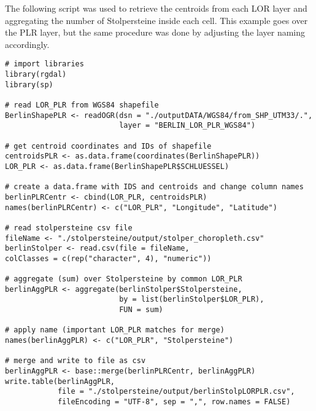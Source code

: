 The following script was used to retrieve the centroids from each LOR layer and aggregating the number of Stolpersteine inside each cell. This example goes over the PLR layer, but the same procedure was done by adjusting the layer naming accordingly. 

\begin{lstlisting}[title = R script for retrieving centroids and aggregating on LOR layer]
# import libraries
library(rgdal)
library(sp)

# read LOR_PLR from WGS84 shapefile
BerlinShapePLR <- readOGR(dsn = "./outputDATA/WGS84/from_SHP_UTM33/.",
                          layer = "BERLIN_LOR_PLR_WGS84")

# get centroid coordinates and IDs of shapefile
centroidsPLR <- as.data.frame(coordinates(BerlinShapePLR))
LOR_PLR <- as.data.frame(BerlinShapePLR$SCHLUESSEL)

# create a data.frame with IDS and centroids and change column names
berlinPLRCentr <- cbind(LOR_PLR, centroidsPLR)
names(berlinPLRCentr) <- c("LOR_PLR", "Longitude", "Latitude")

# read stolpersteine csv file
fileName <- "./stolpersteine/output/stolper_choropleth.csv"
berlinStolper <- read.csv(file = fileName, 
colClasses = c(rep("character", 4), "numeric"))

# aggregate (sum) over Stolpersteine by common LOR_PLR
berlinAggPLR <- aggregate(berlinStolper$Stolpersteine,
						  by = list(berlinStolper$LOR_PLR),
						  FUN = sum)

# apply name (important LOR_PLR matches for merge)
names(berlinAggPLR) <- c("LOR_PLR", "Stolpersteine")

# merge and write to file as csv 
berlinAggPLR <- base::merge(berlinPLRCentr, berlinAggPLR)
write.table(berlinAggPLR,
		    file = "./stolpersteine/output/berlinStolpLORPLR.csv",
		    fileEncoding = "UTF-8", sep = ",", row.names = FALSE)
\end{lstlisting}